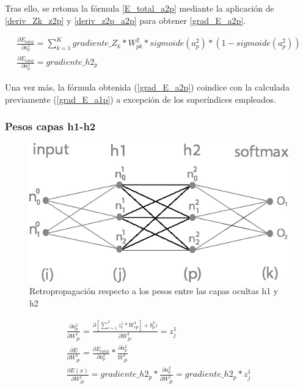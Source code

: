 Tras ello, se retoma la fórmula \ref{E_total_a2p} mediante la aplicación de \ref{deriv_Zk_z2p} y \ref{deriv_z2p_a2p} para obtener \ref{grad_E_a2p}.

\begin{gather}
	\frac{\partial E_{total}}{\partial a^2_p} = \sum_{k=1}^K  gradiente\_Z_k * W^2_{pk} * sigmoide(a^2_p)*(1-sigmoide(a^2_p)) \label{grad_E_a2p} \\
	\frac{\partial E_{total}}{\partial a^2_p} = gradiente\_h2_p
\end{gather}

Una vez más, la fórmula obtenida (\ref{grad_E_a2p}) coindice con la calculada previamente (\ref{grad_E_a1p}) a excepción de los superíndices empleados. \\

\subsubsection{Pesos capas h1-h2}

\begin{figure}[H]
	\centering
	\includegraphics[scale=0.35]{imagenes/nn_2_capa_pesos_h1_h2.jpg}  
	\caption{Retropropagación respecto a los pesos entre las capas ocultas h1 y h2}
	\label{fig:nn_2_pesos_h1_h2}
\end{figure}


\begin{gather}
	\frac{\partial a^2_p }{\partial W^1_{jp} } = \frac{\partial [\sum_{c=1}^{J} z^1_c * W^1_{cp}] + b^2_p)}{\partial W^1_{jp} } = z^1_j \\
	\frac{\partial E}{\partial W^1_{jp}} = \frac{\partial E_{total} }{\partial a^2_p } * \frac{\partial a^2_p}{W^1_{jp}} \\
	\frac{\partial E(x) }{\partial W^1_{jp} } = gradiente\_h2_p * \frac{\partial a^2_p }{\partial W^1_{jp} } = gradiente\_h2_p * z^1_j 
	\label{grad_w1jp}
\end{gather}

